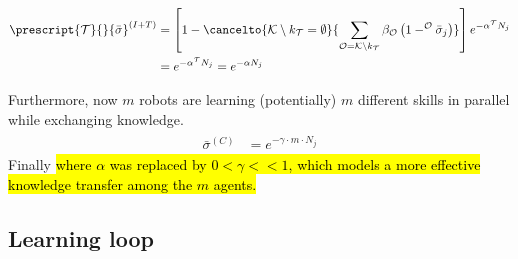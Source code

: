 \begin{align}
    \begin{split}
        \prescript{\mathcal{T}}{}{\bar{\sigma}}^{(I+T)} &= \left[1- \cancelto{\mathcal{K} \setminus k_\mathcal{T}=\emptyset}{\sum_{\mathcal{O}=\mathcal{K} \setminus k_\mathcal{T}}\beta_\mathcal{O} \left( 1 - ^\mathcal{O}\bar{\sigma}_j \right)}\right]e^{-\alpha ^\mathcal{T}N_j}\\
        &= e^{-\alpha ^\mathcal{T}N_j} = e^{-\alpha N_j} 
    \end{split}
\end{align}

Furthermore, now $m$ robots are learning (potentially) $m$ different skills in parallel while exchanging knowledge.
\begin{align}
\begin{split}
    \bar{\sigma}^{(C)} &= e^{-\gamma \cdot m\cdot N_j}    
\end{split}
\end{align}
Finally
\hl{where $\alpha$ was replaced by $ 0<\gamma<<1$, which models a more effective knowledge transfer among the $m$ agents.}


\subsection{Learning loop}

%




